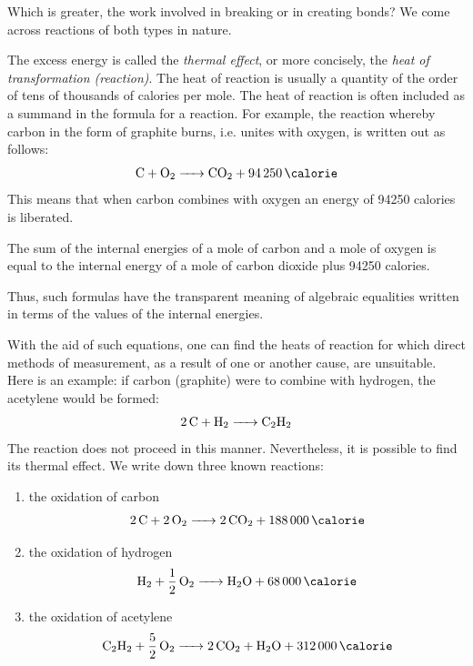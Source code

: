 Which is greater, the work involved in breaking or in creating bonds? We come across reactions of both types in nature.

The excess energy is called the \emph{thermal effect}, or more concisely, the \emph{heat of transformation (reaction)}. The heat of reaction is usually a quantity of the order of tens of thousands of calories per mole. The heat of reac­tion is often included as a summand in the formula for a reaction.
For example, the reaction whereby carbon in the form of graphite burns, i.e. unites with oxygen, is written out as follows:
\begin{equation*}%
\ce{C + O2 -> CO2 + \SI{94250}{\calorie}}
\end{equation*}
This means that when carbon combines with oxygen an energy of \num{94250} calories is liberated.

The sum of the internal energies of a mole of carbon and a mole of oxygen is equal to the internal energy of a mole of carbon dioxide plus \num{94250} calories.

Thus, such formulas have the transparent meaning of algebraic equalities written in terms of the values of the internal energies.

With the aid of such equations, one can find the heats of reaction for which direct methods of measurement, as a result of one or another cause, are unsuitable. Here is an example: if carbon (graphite) were to combine with hydrogen, the acetylene would be formed:
\begin{equation*}%
\ce{2C + H2 -> C2H2}
\end{equation*}
The reaction does not proceed in this manner. Never­theless, it is possible to find its thermal effect. We write down three known reactions:

\begin{enumerate}
\item the oxidation of carbon
\begin{equation*}%
\ce{2C + 2O2 -> 2CO2 + \SI{188000}{\calorie}}
\end{equation*}
\item the oxidation of hydrogen 
\begin{equation*}%
\ce{H2 + 1/2O2 -> H2O + \SI{68000}{\calorie}}
\end{equation*}
\item the oxidation of acetylene 
\begin{equation*}%
\ce{C2H2 + 5/2O2 -> 2CO2 + H2O + \SI{312000}{\calorie}}
\end{equation*}
\end{enumerate}

